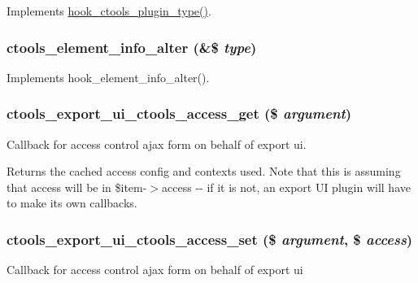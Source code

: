 \label{ctools_8module_a76a9ad5ac309f0526af308e38aa3f574}
Implements \hyperlink{group__hooks_gacb27d27849a3374ddda0120603d549ac}{hook\_\-ctools\_\-plugin\_\-type()}. \hypertarget{ctools_8module_a555fb0b73704f629803ed07eff93f97d}{
\subsubsection[{ctools\_\-element\_\-info\_\-alter}]{\setlength{\rightskip}{0pt plus 5cm}ctools\_\-element\_\-info\_\-alter (\&\$ {\em type})}}
\label{ctools_8module_a555fb0b73704f629803ed07eff93f97d}
Implements hook\_\-element\_\-info\_\-alter(). \hypertarget{ctools_8module_a60ede52adc0e36252c48a28946187ca9}{
\subsubsection[{ctools\_\-export\_\-ui\_\-ctools\_\-access\_\-get}]{\setlength{\rightskip}{0pt plus 5cm}ctools\_\-export\_\-ui\_\-ctools\_\-access\_\-get (\$ {\em argument})}}
\label{ctools_8module_a60ede52adc0e36252c48a28946187ca9}
Callback for access control ajax form on behalf of export ui.

Returns the cached access config and contexts used. Note that this is assuming that access will be in \$item-\/$>$access -\/-\/ if it is not, an export UI plugin will have to make its own callbacks. \hypertarget{ctools_8module_a816f35c4e895c69befa4afd787324880}{
\subsubsection[{ctools\_\-export\_\-ui\_\-ctools\_\-access\_\-set}]{\setlength{\rightskip}{0pt plus 5cm}ctools\_\-export\_\-ui\_\-ctools\_\-access\_\-set (\$ {\em argument}, \/  \$ {\em access})}}
\label{ctools_8module_a816f35c4e895c69befa4afd787324880}
Callback for access control ajax form on behalf of export ui

